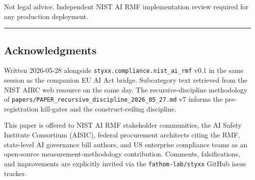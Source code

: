 \documentclass[
]{article}
\begin{document}
Not legal advice. Independent NIST AI RMF implementation review required
for any production deployment.

\begin{center}\rule{0.5\linewidth}{0.5pt}\end{center}

\subsection{Acknowledgments}\label{acknowledgments}

Written 2026-05-28 alongside \texttt{styxx.compliance.nist\_ai\_rmf}
v0.1 in the same session as the companion EU AI Act bridge. Subcategory
text retrieved from the NIST AIRC web resource on the same day. The
recursive-discipline methodology of
\texttt{papers/PAPER\_recursive\_discipline\_2026\_05\_27.md} v7 informs
the pre-registration kill-gates and the construct-ceiling discipline.

This paper is offered to NIST AI RMF stakeholder communities, the AI
Safety Institute Consortium (AISIC), federal procurement architects
citing the RMF, state-level AI governance bill authors, and US
enterprise compliance teams as an open-source measurement-methodology
contribution. Comments, falsifications, and improvements are explicitly
invited via the \texttt{fathom-lab/styxx} GitHub issue tracker.
\end{document}
